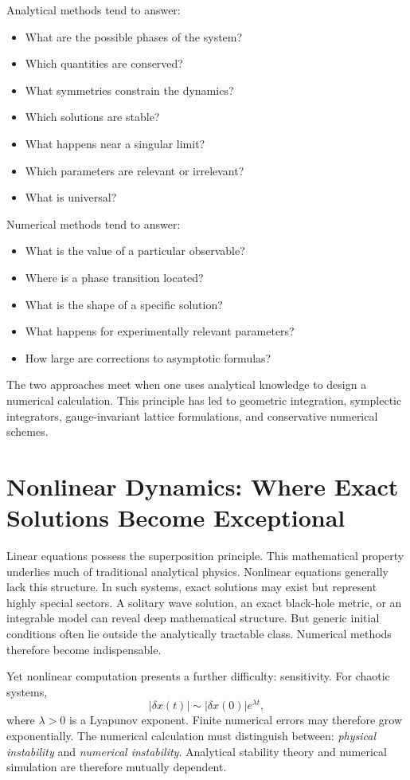 Analytical methods tend to answer:
\begin{itemize}
\item What are the possible phases of the system?
\item Which quantities are conserved?
\item What symmetries constrain the dynamics?
\item Which solutions are stable?
\item What happens near a singular limit?
\item Which parameters are relevant or irrelevant?
\item What is universal?
\end{itemize}
Numerical methods tend to answer:
\begin{itemize}
\item What is the value of a particular observable?
\item Where is a phase transition located?
\item What is the shape of a specific solution?
\item What happens for experimentally relevant parameters?
\item How large are corrections to asymptotic formulas?
\end{itemize}
The two approaches meet when one uses analytical knowledge to design a 
numerical calculation.
This principle has led to geometric integration, symplectic integrators,
gauge-invariant lattice formulations, and conservative numerical schemes.

\section{ Nonlinear Dynamics: Where Exact Solutions Become Exceptional}
\label{nm:nd}

Linear equations possess the superposition principle.
This mathematical property underlies much of traditional analytical physics.
Nonlinear equations generally lack this structure.
In such systems, exact solutions may exist but represent highly special
sectors.
A solitary wave solution, an exact black-hole metric, or an integrable model
can reveal deep mathematical structure. But generic initial conditions often
lie outside the analytically tractable class.
Numerical methods therefore become indispensable.

Yet nonlinear computation presents a further difficulty: sensitivity.
For chaotic systems,
\[|\delta x(t)|\sim |\delta x(0)|e^{\lambda t},\]
where $\lambda>0$ is a Lyapunov exponent.
Finite numerical errors may therefore grow exponentially.
The numerical calculation must distinguish between:
\emph{physical instability} and \emph{numerical instability}.
Analytical stability theory and numerical simulation are therefore mutually dependent.

